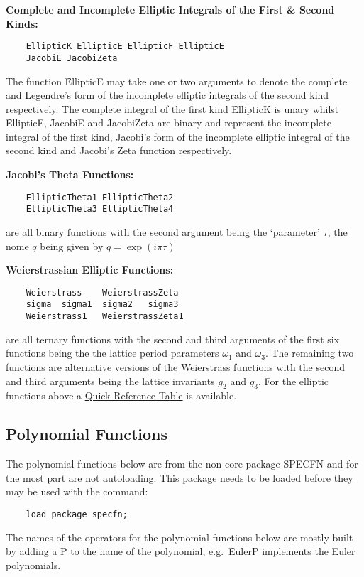 \textbf{Complete and Incomplete Elliptic Integrals of the First \& Second Kinds:}
\begin{verbatim}
    EllipticK EllipticE EllipticF EllipticE
    JacobiE JacobiZeta
\end{verbatim}
The function \f{EllipticE} may take one or two arguments to
denote the complete and Legendre's form of the incomplete elliptic integrals of
the second kind respectively. The complete integral of the first kind
\f{EllipticK} is unary whilst \f{EllipticF}, \f{JacobiE} and
\f{JacobiZeta} are binary and represent the incomplete integral of
the first kind, Jacobi's form of the incomplete elliptic integral of
the second kind and Jacobi's Zeta function respectively.

\textbf{Jacobi's Theta Functions:}
\begin{verbatim}
    EllipticTheta1 EllipticTheta2
    EllipticTheta3 EllipticTheta4
\end{verbatim}
are all binary functions with the second argument being the `parameter' $\tau$,
the nome $q$ being given by $q = \exp(i\pi\tau)$

\textbf{Weierstrassian Elliptic Functions:}
\begin{verbatim}
    Weierstrass    WeierstrassZeta
    sigma  sigma1  sigma2   sigma3
    Weierstrass1   WeierstrassZeta1
\end{verbatim}
are all ternary functions with the second and third arguments of the first
six functions being the the lattice period parameters $\omega_1$ and $\omega_3$.
The remaining two functions are alternative versions of the Weierstrass
functions with the second and third arguments being the lattice invariants
$g_2$ and $g_3$.
For the elliptic functions above
a \hyperlink{SPECFNTAB3}{Quick Reference Table} is available.

\subsection{Polynomial Functions}
The polynomial functions below are from the non-core package SPECFN
and for the most part are not autoloading. This package needs to be loaded
before they may be used with the command:
\begin{verbatim}
    load_package specfn;
\end{verbatim}
The names of the {\REDUCE} operators for the polynomial functions below
are mostly built by adding a P to the name of the polynomial,
e.g.\ \f{EulerP} implements the Euler polynomials.

